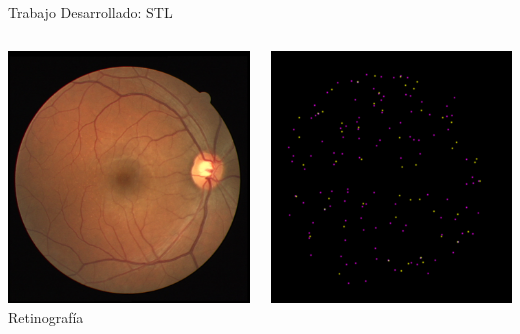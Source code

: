 \documentclass[xcolor=dvipsnames,table]{beamer}
\begin{document}
\begin{frame}{Trabajo Desarrollado: STL }
\begin{columns}[T]
	
	\begin{minipage}[t]{0.35\textwidth}
		\centering
		\includegraphics[width=\textwidth]{my_images/ML/36_training.jpg}\\[1ex]
		{\small Retinografía}
	\end{minipage}\hfill
	\begin{minipage}[t]{0.35\textwidth}
		\centering
		\includegraphics[width=\textwidth]{my_images/ML/jun_36.jpg}\\[1ex]

\end{minipage}
\end{columns}
\end{frame}
\end{document}
